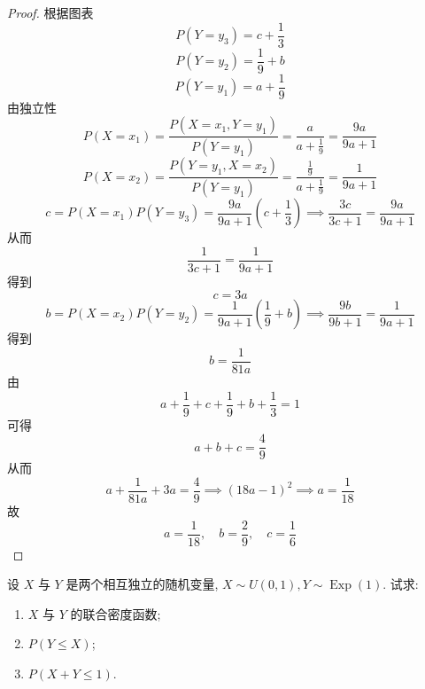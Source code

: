 \documentclass[../main.tex]{subfiles}
\begin{document}
\begin{proof}
   根据图表 \[
     P\left( Y= y_3 \right)= c+ \frac{1}{3} 
     \] \[
     P\left( Y= y_2 \right)= \frac{1}{9}+ b 
     \] \[
     P\left( Y= y_1 \right)= a+ \frac{1}{9} 
     \]由独立性 \[
     P\left( X= x_1 \right)= \frac{P\left( X= x_1, Y= y_1 \right)  }{P\left( Y= y_1 \right)  }= \frac{a }{a+ \frac{1}{9}}  = \frac{9a }{9a+ 1 }  
     \] \[
     P\left( X= x_2 \right)= \frac{P\left( Y= y_1,X= x_2 \right) }{P\left( Y= y_1 \right)  }= \frac{\frac{1}{9} }{a+ \frac{1}{9} }= \frac{1 }{9a+ 1 }    
     \] \[
     c= P\left( X= x_1 \right)P\left( Y= y_3 \right)= \frac{9a }{9a+ 1 }\left( c+ \frac{1}{3} \right)\implies \frac{3c }{3c+ 1 }= \frac{9a }{9a+ 1 }      
     \]从而 \[
     \frac{1 }{3c+ 1 }= \frac{1 }{9a+ 1 }  
     \]得到 \[
     c= 3a
     \] \[
     b= P\left( X= x_2 \right)P\left( Y= y_2 \right)= \frac{1}{9a+ 1} \left( \frac{1}{9}+ b \right)\implies \frac{9b }{9b+ 1 }= \frac{1 }{9a+ 1 }     
     \]得到 \[
    b= \frac{1 }{81a } 
     \]由 \[
     a+ \frac{1}{9}+ c+ \frac{1}{9}+ b+ \frac{1}{3}= 1
     \] 可得\[
     a+ b+ c= \frac{4 }{9 } 
     \]   从而 \[
     a+ \frac{1}{81a}+ 3a= \frac{4}{9}\implies \left( 18a-1 \right)^{2}\implies a= \frac{1 }{18 }  
     \]故 \[
     a= \frac{1}{18},\quad b= \frac{2 }{9 },\quad c= \frac{1 }{6 }  
     \]
\end{proof}

\begin{exercise}{}{}
设 $X$ 与 $Y$ 是两个相互独立的随机变量, $X \sim U(0,1), Y \sim \operatorname{Exp}(1)$. 试求:
\begin{enumerate}
\item $X$ 与 $Y$ 的联合密度函数;
\item $P(Y \le X)$;
\item $P(X+Y \le 1)$.
\end{enumerate}
\end{exercise}
\end{document}
